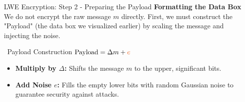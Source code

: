 \documentclass[aspectratio=169, 10pt]{beamer}
\begin{document}
\begin{frame}{LWE Encryption: Step 2 - Preparing the Payload}
    \Large
    \textbf{Formatting the Data Box} \\
    \vspace{0.2cm}
    \normalsize
    We do not encrypt the raw message $m$ directly. First, we must construct the "Payload" (the data box we visualized earlier) by scaling the message and injecting the noise.
    \vspace{0.3cm}
    
    \begin{exampleblock}{\faBox \ Payload Construction}
        \centering
        \vspace{0.2cm}
        \Large $\text{Payload} = \Delta m + \textcolor{AccentOrange}{{e}}$
        \vspace{0.2cm}
    \end{exampleblock}
    \vspace{0.4cm}
    
    \begin{itemize}
        \item \textbf{Multiply by $\Delta$:} Shifts the message $m$ to the upper, significant bits.
        \item \textbf{Add Noise $e$:} Fills the empty lower bits with random Gaussian noise to guarantee security against attacks.
    \end{itemize}
\end{frame}
\end{document}

